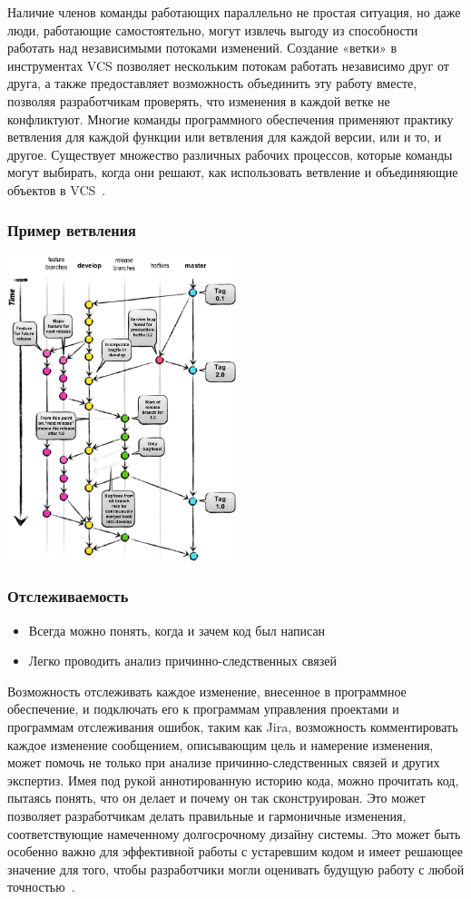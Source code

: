 \documentclass{../industrial-development}
\begin{document}
\lecturenotes

Наличие членов команды работающих параллельно не простая ситуация, но даже люди, работающие самостоятельно, могут извлечь выгоду из способности работать над независимыми потоками изменений. Создание «ветки» в инструментах VCS позволяет нескольким потокам работать независимо друг от друга, а также предоставляет возможность объединить эту работу вместе, позволяя разработчикам проверять, что изменения в каждой ветке не конфликтуют. Многие команды программного обеспечения применяют практику ветвления для каждой функции или ветвления для каждой версии, или и то, и другое. Существует множество различных рабочих процессов, которые команды могут выбирать, когда они решают, как использовать ветвление и объединяющие объектов в VCS~\cite{Atlassian}.

\begin{frame} \frametitle{Пример ветвления}
  \centerline{\includegraphics[width=0.5\textwidth]{branching.pdf}}
\end{frame}

\begin{frame} \frametitle{Отслеживаемость}
 
  \begin{itemize}
  \item Всегда можно понять, когда и зачем код был написан
  \item Легко проводить анализ причинно-следственных связей
  \end{itemize}
\end{frame}

\lecturenotes

Возможность отслеживать каждое изменение, внесенное в программное обеспечение, и подключать его к программам управления проектами и программам отслеживания ошибок, таким как Jira, возможность комментировать каждое изменение сообщением, описывающим цель и намерение изменения, может помочь не только при анализе причинно-следственных связей и других экспертиз. Имея под рукой аннотированную историю кода, можно прочитать код, пытаясь понять, что он делает и почему он так сконструирован. Это может позволяет разработчикам делать правильные и гармоничные изменения, соответствующие намеченному долгосрочному дизайну системы. Это может быть особенно важно для эффективной работы с устаревшим кодом и имеет решающее значение для того, чтобы разработчики могли оценивать будущую работу с любой точностью~\cite{Atlassian}.
\end{document}
